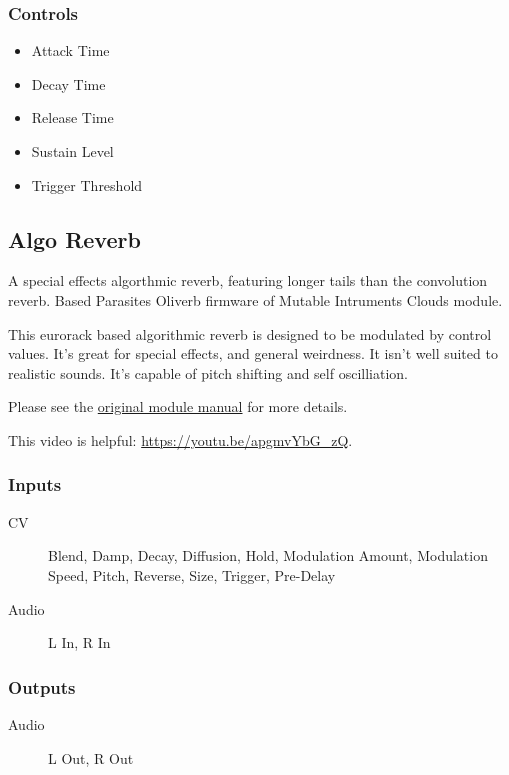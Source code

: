 \subsubsection{Controls}
\begin{itemize}
\item Attack Time
\item Decay Time
\item Release Time
\item Sustain Level
\item Trigger Threshold
\end{itemize}

\subsection{Algo Reverb}

A special effects algorthmic reverb, featuring longer tails than the convolution reverb. Based Parasites Oliverb firmware of Mutable Intruments Clouds module. 

This eurorack based algorithmic reverb is designed to be modulated by control values.
                 It's great for special effects, and general weirdness. It isn't well suited to realistic sounds. It's capable of pitch shifting and self oscilliation.

Please see the \href{https://mqtthiqs.github.io/parasites/clouds.html}{original module manual} for more details.

This video is helpful: \url{https://youtu.be/apgmvYbG_zQ}.

\subsubsection{Inputs}
\begin{description}
\item [CV] Blend, Damp, Decay, Diffusion, Hold, Modulation Amount, Modulation Speed, Pitch, Reverse, Size, Trigger, Pre-Delay
\item [Audio] L In, R In
\end{description}

\subsubsection{Outputs}
\begin{description}
\item [Audio] L Out, R Out
\end{description}

